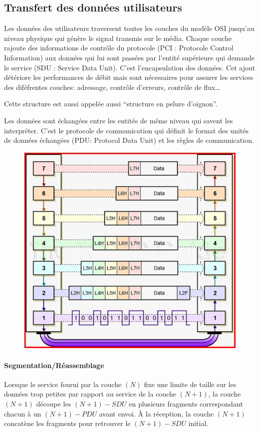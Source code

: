 \subsection{Transfert des données utilisateurs}
Les données des utilisateurs traversent toutes les couches du modèle OSI jusqu'au niveau physique qui génère le signal transmis sur le média. Chaque couche rajoute des informations de contrôle du protocole (PCI : Protocole Control Information) aux données qui lui sont passées par l'entité supérieure qui demande le service (SDU : Service Data Unit). C'est l'encapsulation des données. Cet ajout détériore les performances de débit mais sont nécessaires pour assurer les services des diféfrentes couches: adressage, contrôle d'erreurs, contrôle de flux\ldots

Cette structure est aussi appelée aussi ``structure en pelure d'oignon''.

Les données sont échangées entre les entités de même niveau qui savent les interpréter. C'est le protocole de communication qui définit le format des unités de données échangées (PDU: Protocol Data Unit) et les règles de communication.

\begin{figure}[H]
	\centering
	\includegraphics[width=15cm]{partie1/encapsulation.jpg}
\end{figure}

\paragraph{Segmentation/Réassemblage} Lorsque le service fourni par la couche $(N)$ fixe une limite de taille sur les données trop petites par rapport au service de la couche $(N+1)$, la couche $(N+1)$ découpe les $(N+1)-SDU$ en plusieurs fragments correspondant chacun à un $(N+1)-PDU$ avant envoi. À la réception, la couche $(N+1)$ concatène les fragments pour retrouver le $(N+1)-SDU$ initial.

